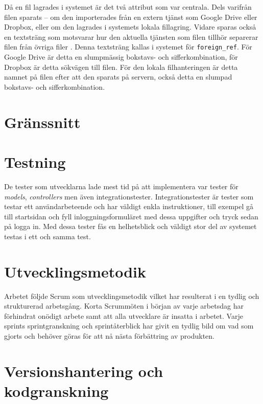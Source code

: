 Då en fil lagrades i systemet är det två attribut som var centrala. Dels
varifrån filen sparats – om den importerades från en extern tjänst som Google
Drive eller Dropbox, eller om den lagrades i systemets lokala fillagring. Vidare
sparas också en textsträng som motsvarar hur den aktuella tjänsten som filen
tillhör separerar filen från övriga filer . Denna textsträng kallas i systemet
för \texttt{foreign\_ref}. För Google Drive är detta en slumpmässig bokstavs- och
sifferkombination, för Dropbox är detta sökvägen till filen. För den lokala
filhanteringen är detta namnet på filen efter att den sparats på servern, också
detta en slumpad bokstavs- och sifferkombination.

\section{Gränssnitt}

\section{Testning}

De tester som utvecklarna lade mest tid på att implementera var tester för
\emph{models}, \emph{controllers} men även integrationstester.
Integrationstester är tester som testar ett användarbeteende och har väldigt
enkla instruktioner, till exempel gå till startsidan och fyll
inloggningsformuläret med dessa uppgifter och tryck sedan på logga in. Med dessa
tester fås en helhetsblick och väldigt stor del av systemet testas i ett och
samma test.

\section{Utvecklingsmetodik}

Arbetet följde Scrum som utvecklingsmetodik vilket har resulterat i en tydlig
och strukturerad arbetsgång. Korta Scrummöten i början av varje arbetsdag har
förhindrat onödigt arbete samt att alla utvecklare är insatta i arbetet. Varje
sprints sprintgranskning och sprintåterblick har givit en tydlig bild om vad som
gjorts och behöver göras för att nå nästa förbättring av produkten.

\section{Versionshantering och kodgranskning}
